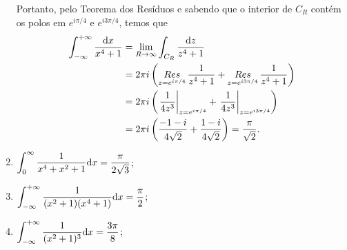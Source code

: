 \begin{questions}
\begin{solution}
\begin{enumerate}[label=(\alph*)]
      Portanto, pelo Teorema dos Resíduos e sabendo que o interior de $C_R$ contém os polos em $e^{i \pi/4}$ e $ e^{i 3\pi/4}$, temos que
      \begin{align*}
          \int_{-\infty}^{+\infty} \frac{\mathrm{d} x}{x^4 + 1} &= \lim_{R\to\infty}\int_{C_R} \frac{\mathrm{d} z}{z^4 + 1}\\
            &= 2\pi i \left( \mathop{Res}\limits_{z = e^{i \pi/4}}  \frac{1}{z^4 + 1} + \mathop{Res}\limits_{z = e^{i 3\pi/4}}  \frac{1}{z^4 + 1} \right) \\
                &= 2\pi i \left( \left. \frac{1}{4z^3} \right|_{z=e^{i \pi/4}} + \left. \frac{1}{4z^3} \right|_{z=e^{i 3\pi/4}} \right) \\
                &= 2\pi i \left( \frac{-1-i}{4\sqrt{2}} + \frac{1-i}{4\sqrt{2}} \right) = \frac{\pi}{\sqrt{2}}.
      \end{align*}

      \item $\displaystyle \int_0^{\infty} \frac{1}{x^4 + x^2 + 1} \mathrm{d} x = \frac{\pi}{2\sqrt{3}}$;
      
      \item $\displaystyle \int_{-\infty}^{+\infty} \frac{1}{(x^2 + 1)(x^4 + 1)} \mathrm{d} x = \frac{\pi}{2}$;
      
      \item $\displaystyle \int_{-\infty}^{+\infty} \frac{1}{(x^2 + 1)^3} \mathrm{d} x = \frac{3\pi}{8}$;
      

\end{enumerate}
\end{solution}
\end{questions}

